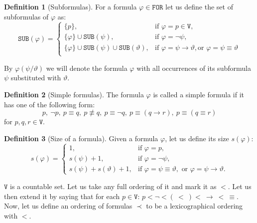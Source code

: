 \documentclass{article}
\theoremstyle{definition}
\newtheorem{definition}{Definition}[section]
\theoremstyle{definition}
\theoremstyle{definition}
\newcommand*{\id}{\equiv}
\newcommand*{\ra}{\rightarrow}
\newcommand*{\V}{\texttt{V}}
\newcommand*{\FOR}{\texttt{FOR}}
\newcommand*{\SUB}{\texttt{SUB}}
\begin{document}
\begin{definition}[Subformulas]
    For a formula $\varphi \in \FOR$ let us define the set of subformulas of $\varphi$ as:
    $$
        \SUB(\varphi) = \begin{cases}
            \{p\},                                            & \text{if } \varphi = p \in \V,                                                   \\
            \{\varphi\} \cup \SUB(\psi),                      & \text{if } \varphi = \lnot \psi,                                                 \\
            \{\varphi\} \cup \SUB(\psi) \cup \SUB(\vartheta), & \text{if } \varphi = \psi \ra \vartheta, \text{or } \varphi = \psi \id \vartheta \\
        \end{cases}
    $$
\end{definition}
By $\varphi(\psi / \vartheta)$ we will denote the formula $\varphi$ with all
occurrences of its subformula $\psi$ substituted with $\vartheta$.

\begin{definition}[Simple formulas]
    The formula $\varphi$ is called a simple formula if it has one of the following form:
    $$
        p,\ \lnot p,\ p \id q,\ p \not \id q,\ p \id \lnot q,\ p \id (q \ra r),\ p \id (q \id r)
    $$
    for $p, q, r \in \V$.
\end{definition}

\begin{definition}[Size of a formula]
    Given a formula $\varphi$, let us define its size $s(\varphi)$:
    $$
        s(\varphi) = \begin{cases}
            1,                          & \text{if } \varphi = p,                                                                      \\
            s(\psi) + 1,                & \text{if } \varphi = \lnot \psi,                                                             \\
            s(\psi) + s(\vartheta) + 1, & \text{if } \varphi = \psi \equiv \vartheta,\text{ or } \varphi = \psi \rightarrow \vartheta.
        \end{cases}
    $$
\end{definition}
$\V$ is a countable set. Let us take any full ordering of it and mark it as $<$. Let us then
extend it by saying that for each $p \in \V$: $p < \lnot <\xspace (\ < \ )\xspace<\ \ra\ <\ \id$. Now,
let us define an ordering of formulas $\prec$ to be a lexicographical ordering
with $<$.
\end{document}
